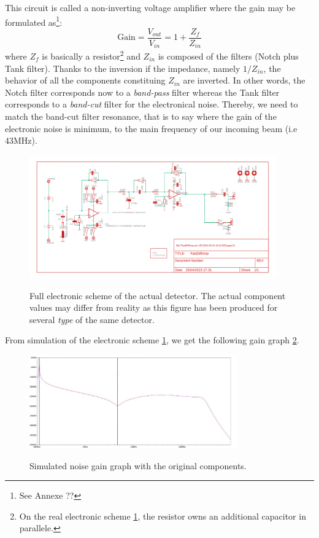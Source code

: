\documentclass[10pt]{report}
\begin{document}
This circuit is called a non-inverting voltage amplifier where the gain may be formulated as\footnote{See Annexe ??}:
\begin{equation}
\textrm{Gain} = \frac{V_{out}}{V_{in}} = 1 + \frac{Z_{f}}{Z_{in}}
\end{equation}
where $Z_f$ is basically a resistor\footnote{On the real electronic scheme \ref{fig:elec-scheme}, the resistor owns an additional capacitor in parallele.} and $Z_{in}$ is composed of the filters (Notch plus Tank filter). Thanks to the inversion if the impedance, namely $1/Z_{in}$, the behavior of all the components constituing $Z_{in}$ are inverted. In other words, the Notch filter corresponds now to a \textit{band-pass} filter whereas the Tank filter corresponds to a \textit{band-cut} filter for the electronical noise. Thereby, we need to match the band-cut filter resonance, that is to say where the gain of the electronic noise is minimum, to the main frequency of our incoming beam (i.e 43MHz).

\begin{figure}[h!]
\caption{Full electronic scheme of the actual detector. The actual component values may differ from reality as this figure has been produced for several \textit{type} of the same detector.}
\centering
\includegraphics[width=0.95\textwidth]{elec-scheme}
\label{fig:elec-scheme}
\end{figure}

From simulation of the electronic scheme \ref{fig:elec-scheme}, we get the following gain graph \ref{fig:noise_gain_opamp_original}. 

\begin{figure}[h!]
\caption{Simulated noise gain graph with the original components.}
\centering
\includegraphics[width=0.8\textwidth]{noise_gain_opamp_original}
\label{fig:noise_gain_opamp_original}
\end{figure}
\end{document}
